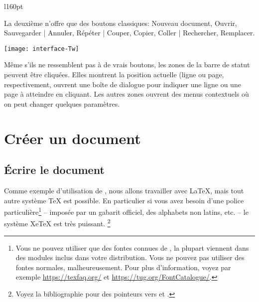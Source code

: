 \begin{wrapfigure}[2]{l}{160pt}
\vspace*{-1em}
\usebox{\inlineimg}
\end{wrapfigure}
\noindent La deuxième n'offre que des boutons classiques: Nouveau document, Ouvrir, Sauvegarder | Annuler, Répéter | Couper, Copier, Coller | Rechercher, Remplacer.

\begin{center}
\texttt{[image: interface-Tw]}
\end{center}

Même s'ils ne ressemblent pas à de vrais boutons, les zones de la barre de statut peuvent être cliquées. Elles montrent la position actuelle (ligne ou page, respectivement, ouvrent une boîte de dialogue pour indiquer une ligne ou une page à atteindre en cliquant. Les autres zones ouvrent des menus contextuels où on peut changer quelques paramètres.


\section{Créer un document}

\subsection{Écrire le document}

Comme exemple d'utilisation de \Tw, nous allons travailler avec \LaTeX{}, mais tout autre système \TeX{} est possible. En particulier si vous avez besoin d'une police particulière\footnote{Vous ne pouvez utiliser que des fontes connues de \AllTeX, la plupart viennent dans des modules inclus dans votre distribution. Vous ne pouvez pas utiliser des fontes \og normales\fg, malheureusement. Pour plus d'information, voyez par exemple \url{https://texfaq.org/} et \url{https://tug.org/FontCatalogue/}.} -- imposée par un gabarit officiel, des alphabets non latins, etc. -- le système XeTeX est très puissant. \footnote{Voyez la bibliographie pour des pointeurs vers \XeTeX{} et \XeLaTeX.}

